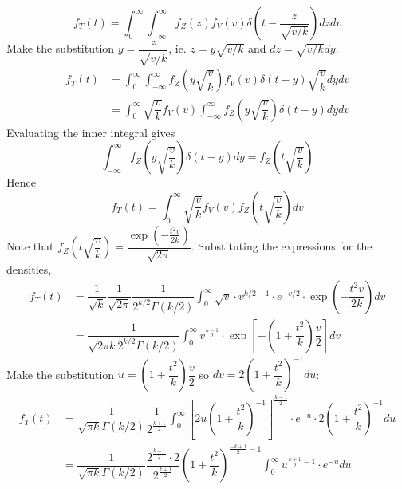 \documentclass[11pt]{report} %
\begin{document}
\begin{equation}
f_{T}\left(t\right)=\int_{0}^{\infty}\int_{-\infty}^{\infty}f_{Z}\left(z\right)f_{V}\left(v\right)\delta\left(t-\dfrac{z}{\sqrt{v/k}}\right)dzdv
\end{equation}
Make the substitution $y = \dfrac{z}{\sqrt{v/k}}$, ie. $z = y\sqrt{v/k}$ and $dz = \sqrt{v/k}dy$.
\begin{align}
f_{T}\left(t\right) &= \int_{0}^{\infty}\int_{-\infty}^{\infty}f_{Z}\left(y\sqrt{\dfrac{v}{k}}\right)f_{V}\left(v\right)\delta\left(t-y\right)\sqrt{\dfrac{v}{k}}dydv \\
&= \int_{0}^{\infty}\sqrt{\dfrac{v}{k}}f_{V}\left(v\right)\int_{-\infty}^{\infty}f_{Z}\left(y\sqrt{\dfrac{v}{k}}\right)\delta\left(t-y\right)dydv
\end{align}
Evaluating the inner integral gives
\begin{equation}
\int_{-\infty}^{\infty}f_{Z}\left(y\sqrt{\dfrac{v}{k}}\right)\delta\left(t-y\right)dy=f_{Z}\left(t\sqrt{\dfrac{v}{k}}\right)
\end{equation}
Hence
\begin{equation}
f_{T}\left(t\right)=\int_{0}^{\infty}\sqrt{\dfrac{v}{k}}f_{V}\left(v\right)f_{Z}\left(t\sqrt{\dfrac{v}{k}}\right)dv
\end{equation}
Note that $f_{Z}\left(t\sqrt{\dfrac{v}{k}}\right)=\dfrac{\exp\left(-\frac{t^{2}v}{2k}\right)}{\sqrt{2\pi}}$. Substituting the expressions for the densities,
\begin{align}
f_{T}\left(t\right) &= \dfrac{1}{\sqrt{k}}\dfrac{1}{\sqrt{2\pi}}\dfrac{1}{2^{k/2}\Gamma\left(k/2\right)}\int_{0}^{\infty}\sqrt{v}\cdot v^{k/2-1}\cdot e^{-v/2}\cdot\exp\left(-\dfrac{t^{2}v}{2k}\right)dv \\
&= \dfrac{1}{\sqrt{2\pi k}2^{k/2}\Gamma\left(k/2\right)}\int_{0}^{\infty}v^{\frac{k-1}{2}}\cdot\exp\left[-\left(1+\dfrac{t^{2}}{k}\right)\dfrac{v}{2}\right]dv
\end{align}
Make the substitution $u = \left(1+\dfrac{t^{2}}{k}\right)\dfrac{v}{2}$ so $dv = 2\left(1+\dfrac{t^{2}}{k}\right)^{-1}du$:
\begin{align}
f_{T}\left(t\right) &= \dfrac{1}{\sqrt{\pi k}\Gamma\left(k/2\right)}\dfrac{1}{2^{\frac{k+1}{2}}}\int_{0}^{\infty}\left[2u\left(1+\dfrac{t^{2}}{k}\right)^{-1}\right]^{\frac{k-1}{2}}\cdot e^{-u}\cdot2\left(1+\dfrac{t^{2}}{k}\right)^{-1}du \\
&= \dfrac{1}{\sqrt{\pi k}\Gamma\left(k/2\right)}\dfrac{2^{\frac{k-1}{2}}\cdot2}{2^{\frac{k+1}{2}}}\left(1+\dfrac{t^{2}}{k}\right)^{\frac{-k+1}{2}-1}\int_{0}^{\infty}u^{\frac{k+1}{2}-1}\cdot e^{-u}du
\end{align}
\end{document}

